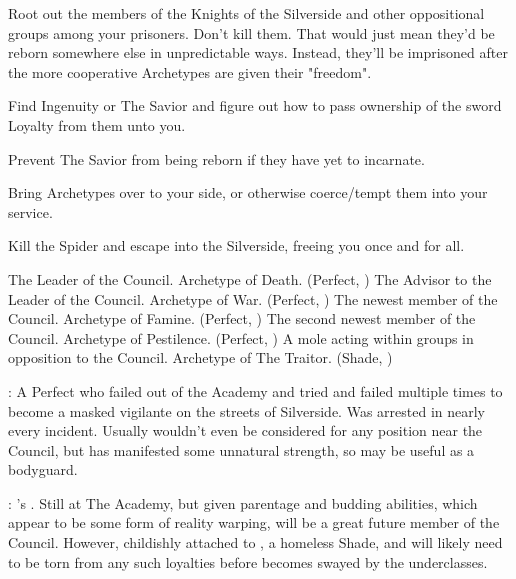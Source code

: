 \documentclass[blue]{Silversiders}
\begin{document}
\begin{itemz}[Goals]
  \item Root out the members of the Knights of the Silverside and other oppositional groups among your prisoners. Don't kill them. That would just mean they'd be reborn somewhere else in unpredictable ways. Instead, they'll be imprisoned after the more cooperative Archetypes are given their "freedom".
  \item Find Ingenuity or The Savior and figure out how to pass ownership of the sword Loyalty from them unto you.
  \item Prevent The Savior from being reborn if they have yet to incarnate. 
  \item Bring Archetypes over to your side, or otherwise coerce/tempt them into your service.
  \item Kill the Spider and escape into the Silverside, freeing you once and for all.
\end{itemz}

\begin{members}
	\member{\cDeath{}} The Leader of the Council. Archetype of Death. (Perfect, \cDeath{\Sex})
	\member{\cWar{}} The Advisor to the Leader of the Council. Archetype of War. (Perfect, \cWar{\Sex})
	\member{\cFamine{}} The newest member of the Council. Archetype of Famine. (Perfect, \cFamine{\Sex})
	\member{\cPestilence{}} The second newest member of the Council. Archetype of Pestilence. (Perfect, \cPestilence{\Sex})
	\member{\cTraitor{}} A mole acting within groups in opposition to the Council. Archetype of The Traitor. (Shade, \cTraitor{\Sex})
	
\end{members}

\begin{itemz}
	\item \cMuscle{}: A \cMuscle{\sex} Perfect who failed out of the Academy and tried and failed multiple times to become a masked vigilante on the streets of Silverside. Was arrested in nearly every incident. Usually wouldn't even be considered for any position near the Council, but has manifested some unnatural strength, so \cMuscle{\they} may be useful as a bodyguard.
	\item \cTruth{}: \cDeath{}'s \cTruth{\offspring}. Still at The Academy, but given \cTruth{\their} parentage and budding abilities, which appear to be some form of reality warping, will be a great future member of the Council. However, \cTruth{\theyre} childishly attached to \cWisdom{}, a homeless Shade, and will likely need to be torn from any such loyalties before \cTruth{\they} becomes swayed by the underclasses.
					
\end{itemz}
\end{document}
